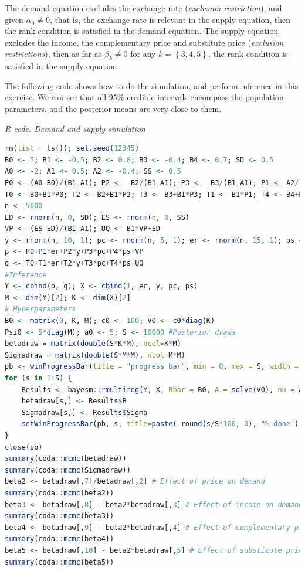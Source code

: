 \begin{enumerate}[leftmargin=*]
The demand equation excludes the exchange rate (\textit{exclusion restriction}), and given $\alpha_3\neq 0$, that is, the exchange rate is relevant in the supply equation, then the rank condition is satisfied in the demand equation. The supply equation excludes the income, the complementary price and substitute price (\textit{exclusion restrictions}), then as far as $\beta_k\neq 0$ for any $k=\left\{3,4,5\right\}$, the rank condition is satisfied in the supply equation.

The following code shows how to do the simulation, and perform inference in this exercise. We can see that all 95\% credible intervals encompass the population parameters, and the posterior means are very close to them.
 
\begin{tcolorbox}[enhanced,width=4.67in,center upper,
	fontupper=\large\bfseries,drop shadow southwest,sharp corners]
	\textit{R code. Demand and supply simulation}
	\begin{VF}
		\begin{lstlisting}[language=R]
rm(list = ls()); set.seed(12345)
B0 <- 5; B1 <- -0.5; B2 <- 0.8; B3 <- -0.4; B4 <- 0.7; SD <- 0.5
A0 <- -2; A1 <- 0.5; A2 <- -0.4; SS <- 0.5
P0 <- (A0-B0)/(B1-A1); P2 <- -B2/(B1-A1); P3 <- -B3/(B1-A1); P1 <- A2/(B1-A1); P4 <- -B4/(B1-A1)
T0 <- B0+B1*P0; T2 <- B2+B1*P2; T3 <- B3+B1*P3; T1 <- B1*P1; T4 <- B4+B1*P4;
n <- 5000
ED <- rnorm(n, 0, SD); ES <- rnorm(n, 0, SS)
VP <- (ES-ED)/(B1-A1); UQ <- B1*VP+ED
y <- rnorm(n, 10, 1); pc <- rnorm(n, 5, 1); er <- rnorm(n, 15, 1); ps <- rnorm(n, 5, 1);
p <- P0+P1*er+P2*y+P3*pc+P4*ps+VP
q <- T0+T1*er+T2*y+T3*pc+T4*ps+UQ
#Inference
Y <- cbind(p, q); X <- cbind(1, er, y, pc, ps)
M <- dim(Y)[2]; K <- dim(X)[2]
# Hyperparameters
B0 <- matrix(0, K, M); c0 <- 100; V0 <- c0*diag(K)
Psi0 <- 5*diag(M); a0 <- 5; S <- 10000 #Posterior draws
betadraw = matrix(double(S*K*M), ncol=K*M)
Sigmadraw = matrix(double(S*M*M), ncol=M*M)
pb <- winProgressBar(title = "progress bar", min = 0, max = S, width = 300)
for (s in 1:S) {
	Results <- bayesm::rmultireg(Y, X, Bbar = B0, A = solve(V0), nu = a0, V = Psi0)
	betadraw[s,] <- Results$B
	Sigmadraw[s,] <- Results$Sigma
	setWinProgressBar(pb, s, title=paste( round(s/S*100, 0), "% done"))
}
close(pb)
summary(coda::mcmc(betadraw))
summary(coda::mcmc(Sigmadraw))
beta2 <- betadraw[,7]/betadraw[,2] # Effect of price on demand 
summary(coda::mcmc(beta2))
beta3 <- betadraw[,8] - beta2*betadraw[,3] # Effect of income on demand
summary(coda::mcmc(beta3))
beta4 <- betadraw[,9] - beta2*betadraw[,4] # Effect of complementary price on demand
summary(coda::mcmc(beta4))
beta5 <- betadraw[,10] - beta2*betadraw[,5] # Effect of substitute price  on demand
summary(coda::mcmc(beta5))
\end{lstlisting}
	\end{VF}
\end{tcolorbox}


\end{enumerate}
